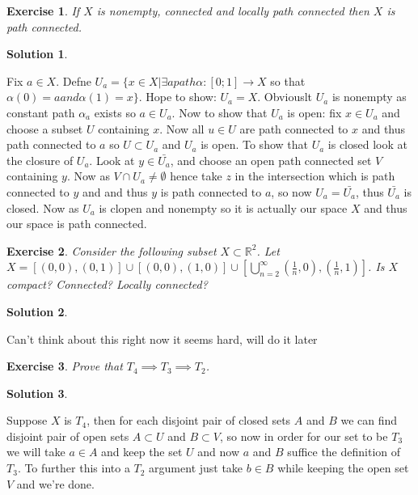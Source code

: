 \documentclass[11pt,a4paper]{article}
\newtheorem{Ex}{Exercise}
\newtheorem{Sol}{Solution}
\begin{document}
\begin{Ex}
	If $X$ is nonempty, connected and locally path connected then $X$ is path connected.
\end{Ex}
\begin{Sol}\end{Sol}
\noindent Fix $a\in X$. Defne $U_a = \{x \in X|\exists a path \alpha:[0; 1] \rightarrow X$ so that
$\alpha(0) = a and \alpha(1) = x\}$. Hope to show: $U_a = X$. Obviouslt $U_a$ is nonempty as constant path $\alpha_a$ exists so $a \in U_a$. Now  to show that $U_a$ is open: fix $x \in U_a$ and choose a subset $U$ containing $x$. Now all $u \in U$ are path connected to $x$ and thus path connected to $a$ so $U \subset U_a$ and $U_a$ is open. To show that $U_a$ is closed look at the closure of $U_a$. Look at $y\in \bar{U_a}$, and choose an open path connected set $V$ containing $y$. Now as $V \cap U_a \neq \emptyset$ hence take $z$ in the intersection which is path connected to $y$ and and thus $y$ is path connected to $a$, so now $U_a = \bar{U_a}$, thus $\bar{U_a}$ is closed. Now as $U_a$ is clopen and nonempty so it is actually our space $X$ and thus our space is path connected.

\begin{Ex}
	Consider the following subset $X \subset \mathbb{R}^2$. Let $X = [(0,0),(0,1)] \cup [(0,0),(1,0)] \cup [\bigcup_{n=2}^{\infty}(\frac{1}{n},0),(\frac{1}{n},1)]$. Is $X$ compact? Connected? Locally connected? 
\end{Ex}

\begin{Sol}\end{Sol}
Can't think about this right now it seems hard, will do it later

\begin{Ex}
	Prove that $T_4 \implies T_3 \implies T_2$.
\end{Ex}
\begin{Sol}\end{Sol}
Suppose $X$ is $T_4$, then for each disjoint pair of closed sets $A$ and $B$ we can find disjoint pair of open sets $A\subset U$ and $B\subset V$, so now in order for our set to be $T_3$ we will take $a \in A$ and keep the set $U$ and now $a$ and $B$ suffice the definition of $T_3$. To further this into a $T_2$ argument just take $b \in B$ while keeping the open set $V$ and we're done.
\end{document}
